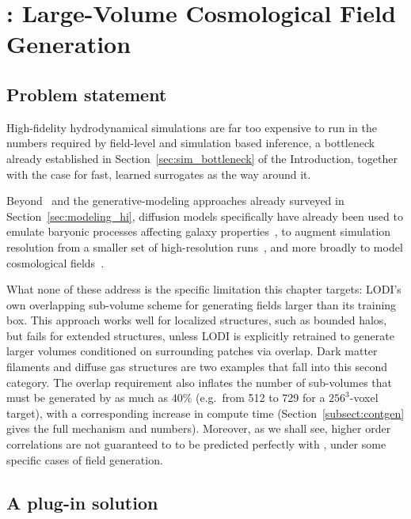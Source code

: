 
\chapter{\FOLD: Large-Volume Cosmological Field Generation}
\label{ch:cosmofold}


\section{Problem statement}

High-fidelity hydrodynamical simulations are far too expensive to run in the numbers required by field-level and simulation based inference, a bottleneck already established in Section~\ref{sec:sim_bottleneck} of the Introduction, together with the case for fast, learned surrogates as the way around it. 



Beyond \LODI\ and the generative-modeling approaches already surveyed in Section~\ref{sec:modeling_hi}, diffusion models specifically have already been used to emulate baryonic processes affecting galaxy properties~\citep{Chadayammuri_2023}, to augment simulation resolution from a smaller set of high-resolution runs~\citep{kodi20}, and more broadly to model cosmological fields~\citep{rouhiainen_cosmology_2024}.


What none of these address is the specific limitation this chapter targets: LODI's own overlapping sub-volume scheme for generating fields larger than its training box. This approach works well for localized structures, such as bounded halos, but fails for extended structures, unless LODI is explicitly retrained to generate larger volumes conditioned on surrounding patches via overlap. Dark matter filaments and diffuse gas structures are two examples that fall into this second category. The overlap requirement also inflates the number of sub-volumes that must be generated by as much as 40\% (e.g.\ from 512 to 729 for a $256^3$-voxel target), with a corresponding increase in compute time (Section~\ref{subsect:contgen} gives the full mechanism and numbers). Moreover, as we shall see, higher order correlations are not guaranteed to to be predicted perfectly with \LODI, under some specific cases of field generation.

\section{A plug-in solution}

